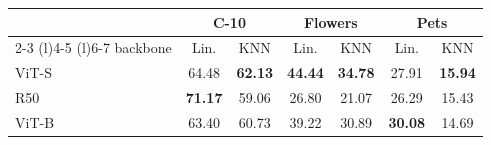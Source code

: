 

\centering
\setlength{\tabcolsep}{2pt}
\caption{\centering Backbone\\(SimCLR, ImageNet-100-LT)}
{\begin{tabular}{l cc cc cc}
    \toprule
     & \multicolumn{2}{c}{\textbf{C-10}} &  \multicolumn{2}{c}{\textbf{Flowers}} &  \multicolumn{2}{c}{\textbf{Pets}} \\
     \cmidrule(r){2-3}
     \cmidrule(l){4-5}
     \cmidrule(l){6-7}
    backbone & Lin. & KNN & Lin. & KNN & Lin. & KNN \\
    \midrule
    \multirow{1}{*}{ViT-S}     & 64.48   & \textbf{62.13}  & \textbf{44.44} & \textbf{34.78} & 27.91 & \textbf{15.94} \\
    \multirow{1}{*}{R50}  &   \textbf{71.17}   & 59.06  & 26.80 & 21.07 & 26.29 & 15.43 \\
    \multirow{1}{*}{ViT-B}     & 63.40 & 60.73 & 39.22 & 30.89 & \textbf{30.08} & 14.69\\
    \bottomrule
\end{tabular}
    \label{table:backbone_abl}
}
